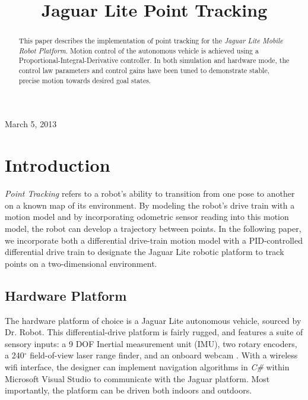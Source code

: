 \documentclass[conference]{IEEEtran}
\begin{document}
%
\title{Jaguar Lite Point Tracking}

\author{
\and
{}
}

\maketitle
{\flushleft March 5, 2013}\\
\IEEEpeerreviewmaketitle

\begin{abstract}
This paper describes the implementation of point tracking for the \emph{Jaguar Lite Mobile Robot Platform}. Motion control of the autonomous vehicle is achieved using a Proportional-Integral-Derivative controller. In both simulation and hardware mode, the control law parameters and control gains have been tuned to demonstrate stable, precise motion towards desired goal states.
\end{abstract} 

\section{Introduction}
\emph{Point Tracking} refers to a robot's ability to transition 
from one pose to another on a known map of its environment. By modeling the 
robot's drive train with a motion model and by incorporating odometric 
sensor reading into this motion model, the robot can develop a trajectory 
between points.  In the following paper, we incorporate both a differential drive-train 
motion model with a PID-controlled differential drive train to designate the
Jaguar Lite robotic platform to track points on a two-dimensional environment.

\subsection{Hardware Platform}
The hardware platform of choice is a Jaguar Lite autonomous vehicle, sourced 
by Dr. Robot.  This differential-drive platform is fairly rugged, and 
features a suite of sensory inputs: a 9 DOF Inertial measurement unit (IMU), 
two rotary encoders, a 240$^{\circ}$ field-of-view laser range finder, and an
onboard webcam \cite{Dr.RobotWebsite}.  With a wireless wifi interface, the 
designer can implement navigation algorithms in \emph{C\#} within Microsoft Visual Studio to communicate with the Jaguar platform. Most importantly, the platform can  be driven both 
indoors and outdoors. 
\end{document}
